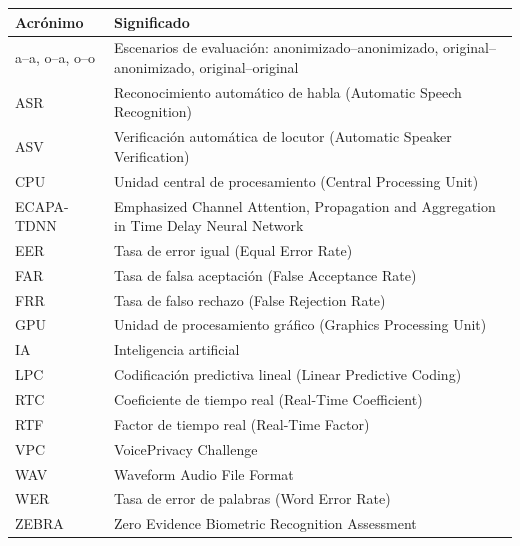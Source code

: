 \documentclass[10pt,twocolumn]{article}
\begin{document}
\begin{center}
\begin{minipage}{\columnwidth}
\centering
\footnotesize
\renewcommand{\arraystretch}{1.16}
\setlength{\tabcolsep}{4pt}
\begin{tabularx}{\columnwidth}{>{\raggedright\arraybackslash}p{2.1cm}>{\raggedright\arraybackslash}X}
\toprule
\textbf{Acrónimo} & \textbf{Significado} \\
\midrule
a--a, o--a, o--o & Escenarios de evaluación: anonimizado--anonimizado, original--anonimizado, original--original \\
\addlinespace[2pt]
ASR & Reconocimiento automático de habla (Automatic Speech Recognition) \\
\addlinespace[2pt]
ASV & Verificación automática de locutor (Automatic Speaker Verification) \\
\addlinespace[2pt]
CPU & Unidad central de procesamiento (Central Processing Unit) \\
\addlinespace[2pt]
ECAPA-TDNN & Emphasized Channel Attention, Propagation and Aggregation in Time Delay Neural Network \\
\addlinespace[2pt]
EER & Tasa de error igual (Equal Error Rate) \\
\addlinespace[2pt]
FAR & Tasa de falsa aceptación (False Acceptance Rate) \\
\addlinespace[2pt]
FRR & Tasa de falso rechazo (False Rejection Rate) \\
\addlinespace[2pt]
GPU & Unidad de procesamiento gráfico (Graphics Processing Unit) \\
\addlinespace[2pt]
IA & Inteligencia artificial \\
\addlinespace[2pt]
LPC & Codificación predictiva lineal (Linear Predictive Coding) \\
\addlinespace[2pt]
RTC & Coeficiente de tiempo real (Real-Time Coefficient) \\
\addlinespace[2pt]
RTF & Factor de tiempo real (Real-Time Factor) \\
\addlinespace[2pt]
VPC & VoicePrivacy Challenge \\
\addlinespace[2pt]
WAV & Waveform Audio File Format \\
\addlinespace[2pt]
WER & Tasa de error de palabras (Word Error Rate) \\
\addlinespace[2pt]
ZEBRA & Zero Evidence Biometric Recognition Assessment \\
\bottomrule
\end{tabularx}
\end{minipage}
\end{center}
\end{document}

